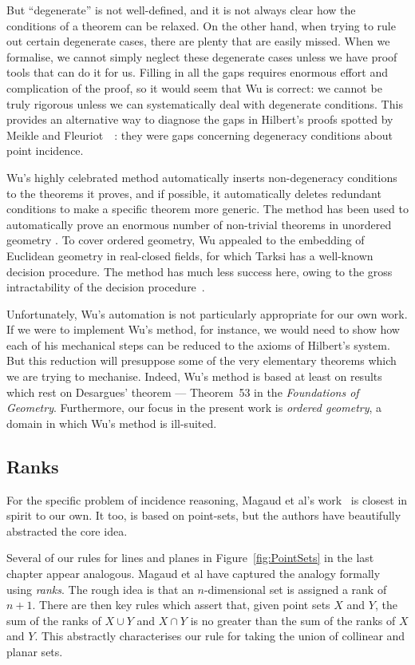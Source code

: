 But ``degenerate'' is not well-defined, and it is not always clear how the conditions of a theorem can be relaxed. On the other hand, when trying to rule out certain degenerate cases, there are plenty that are easily missed. When we formalise, we cannot simply neglect these degenerate cases unless we have proof tools that can do it for us. Filling in all the gaps requires enormous effort and complication of the proof, so it would seem that Wu is correct: we cannot be truly rigorous unless we can systematically deal with degenerate conditions. This provides an alternative way to diagnose the gaps in Hilbert's proofs spotted by Meikle and Fleuriot~~\cite{MeikleFleuriotFormalizingHilbert}: they were gaps concerning degeneracy conditions about point incidence.

Wu's highly celebrated method automatically inserts non-degeneracy conditions to the theorems it proves, and if possible, it automatically deletes redundant conditions to make a specific theorem more generic. The method has been used to automatically prove an enormous number of non-trivial theorems in unordered geometry \cite{MechanicalGeometryTheoremProving}. To cover ordered geometry, Wu appealed to the embedding of Euclidean geometry in real-closed fields, for which Tarksi has a well-known decision procedure. The method has much less success here, owing to the gross intractability of the decision procedure~\cite{TarksiMcNaugtonReview}. 

Unfortunately, Wu's automation is not particularly appropriate for our own work. If we were to implement Wu's method, for instance, we would need to show how each of his mechanical steps can be reduced to the axioms of Hilbert's system. But this reduction will presuppose some of the very elementary theorems which we are trying to mechanise. Indeed, Wu's method is based at least on results which rest on Desargues' theorem --- Theorem~53 in the \emph{Foundations of Geometry}. Furthermore, our focus in the present work is \emph{ordered geometry}, a domain in which Wu's method is ill-suited. 

\subsection{Ranks}
For the specific problem of incidence reasoning, Magaud et al's work~\cite{RankDesargues} is closest in spirit to our own. It too, is based on point-sets, but the authors have beautifully abstracted the core idea. 

Several of our rules for lines and planes in Figure~\ref{fig:PointSets} in the last chapter appear analogous. Magaud et al have captured the analogy formally using \emph{ranks}. The rough idea is that an $n$-dimensional set is assigned a rank of $n+1$. There are then key rules which assert that, given point sets $X$ and $Y$, the sum of the ranks of $X \cup Y$ and $X \cap Y$ is no greater than the sum of the ranks of $X$ and $Y$. This abstractly characterises our rule for taking the union of collinear and planar sets. 


